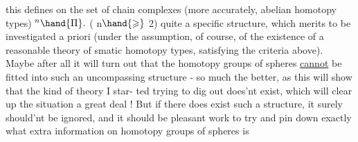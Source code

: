 this defines on the set of chain complexes (more accurately, abelian
homotopy types) ${}^n\hand{\Pi}.$ ( n$\hand{\geqslant}$ 2) quite a specific structure, which merits
to be investigated a priori (under the assumption, of course, of the
existence of a reasonable theory of smatic homotopy types, satisfying
the criteria above). Maybe after all it will\hand{\unsure{,}} turn out that the homotopy
groups of spheres \uline{cannot} be fitted into such an uncompassing structure
- so much the better, as this will show that the kind of theory I star-%
ted trying to dig out does'nt exist, which will clear up the situation
a great deal ! But if there does exist such a  structure, it surely
should'nt be ignored, and it should be pleasant work to try and pin
down exactly what extra information on homotopy groups of spheres is


